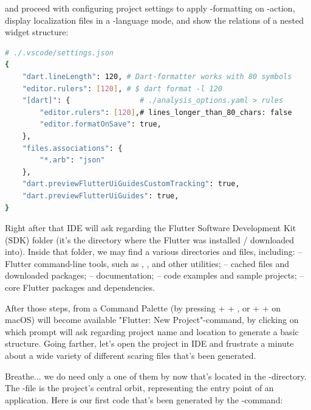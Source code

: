 \noindent and proceed with configuring project settings to apply -formatting on -action, display
localization files in a -language mode, and show the relations of a nested widget structure:

\begin{lstlisting}[language=bash]
# ./.vscode/settings.json
{
    "dart.lineLength": 120, # Dart-formatter works with 80 symbols
    "editor.rulers": [120], # $ dart format -l 120
    "[dart]": {                # ./analysis_options.yaml > rules
        "editor.rulers": [120],# lines_longer_than_80_chars: false
        "editor.formatOnSave": true,
    },
    "files.associations": {
        "*.arb": "json"
    },
    "dart.previewFlutterUiGuidesCustomTracking": true,
    "dart.previewFlutterUiGuides": true,
}
\end{lstlisting}

\noindent Right after that IDE will ask regarding the Flutter Software Development Kit (SDK) folder (it's the directory
where the Flutter was installed / downloaded into). Inside that folder, we may find a various directories and files,
including:
 -- Flutter command-line tools, such as , , and other utilities;
 -- cached files and downloaded packages;
 -- documentation;
 -- code examples and sample projects;
 -- core Flutter packages and dependencies.

After those steps, from a Command Palette (by pressing  +  + , or  +  +
 on macOS) will become available "Flutter: New Project"-command, by clicking on which prompt will ask regarding
project name and location to generate a basic structure. Going farther, let's open the project in IDE and frustrate a
minute about a wide variety of different scaring files that's been generated.

\newpage
\noindent Breathe... we do need only a one of them by now that's located in the -directory. The
-file is the project's central orbit, representing the entry point of an application. Here is our first
code that's been generated by the -command:

